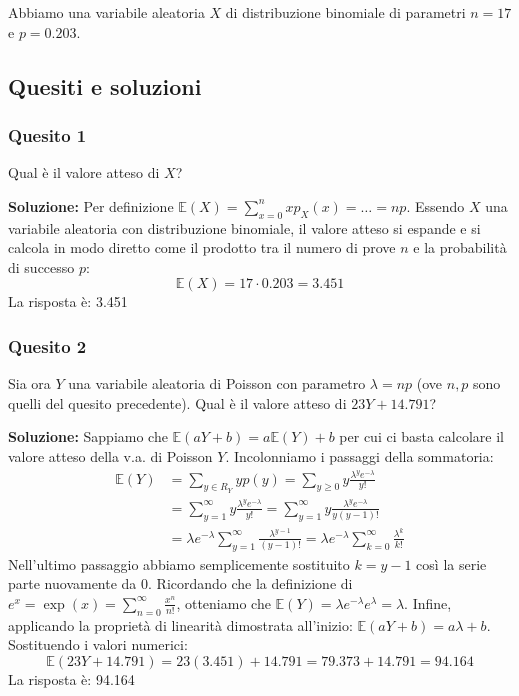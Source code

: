 \documentclass[12pt, a4paper]{article}
\begin{document}
\begin{tcolorbox}[colback=lightergray!10, colframe=tocsec, title=\textbf{Esercizio 1}]
Abbiamo una variabile aleatoria $X$ di distribuzione binomiale di parametri $n=17$ e $p=0.203$.
\end{tcolorbox}

\subsection*{Quesiti e soluzioni}

\subsubsection*{Quesito 1}
Qual è il valore atteso di $X$?

\textbf{Soluzione:}
Per definizione $\mathbb{E}(X)=\sum_{x=0}^{n} x p_X(x) = \dots = np$.
Essendo $X$ una variabile aleatoria con distribuzione binomiale, il valore atteso si espande e si calcola in modo diretto come il prodotto tra il numero di prove $n$ e la probabilità di successo $p$:
$$ \mathbb{E}(X) = 17 \cdot 0.203 = 3.451 $$
La risposta è: 3.451

\subsubsection*{Quesito 2}
Sia ora $Y$ una variabile aleatoria di Poisson con parametro $\lambda=np$ (ove $n,p$ sono quelli del quesito precedente). Qual è il valore atteso di $23Y+14.791$?

\textbf{Soluzione:}
Sappiamo che $\mathbb{E}(aY+b)=a\mathbb{E}(Y)+b$ per cui ci basta calcolare il valore atteso della v.a. di Poisson $Y$. Incolonniamo i passaggi della sommatoria:
$$ \begin{aligned} \mathbb{E}(Y) &= \sum_{y \in R_Y} y p(y) = \sum_{y \geq 0} y \frac{\lambda^y e^{-\lambda}}{y!} \\ &= \sum_{y=1}^\infty y \frac{\lambda^y e^{-\lambda}}{y!} = \sum_{y=1}^\infty y \frac{\lambda^y e^{-\lambda}}{y(y-1)!} \\ &= \lambda e^{-\lambda} \sum_{y=1}^\infty \frac{\lambda^{y-1}}{(y-1)!} = \lambda e^{-\lambda} \sum_{k=0}^\infty \frac{\lambda^k}{k!} \end{aligned} $$
Nell’ultimo passaggio abbiamo semplicemente sostituito $k=y-1$ così la serie parte nuovamente da 0. Ricordando che la definizione di $e^x=\exp(x)=\sum_{n=0}^\infty \frac{x^n}{n!}$, otteniamo che $\mathbb{E}(Y)=\lambda e^{-\lambda} e^\lambda = \lambda$.
Infine, applicando la proprietà di linearità dimostrata all'inizio: $\mathbb{E}(aY+b)=a\lambda+b$. 
Sostituendo i valori numerici:
$$ \mathbb{E}(23Y+14.791) = 23(3.451) + 14.791 = 79.373 + 14.791 = 94.164 $$
La risposta è: 94.164
\end{document}

